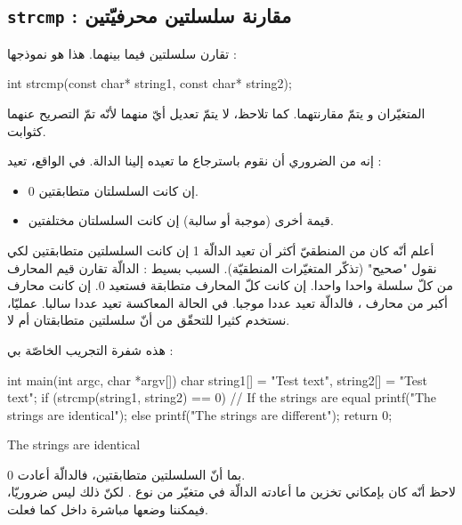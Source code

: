 \subsection{\texttt{strcmp} : مقارنة سلسلتين محرفيّتين}

تقارن سلسلتين فيما بينهما. هذا هو نموذجها :

\begin{Csource}
int strcmp(const char* string1, const char* string2);
\end{Csource}

المتغيّران
و
يتمّ مقارنتهما. كما تلاحظ، لا يتمّ تعديل أيّ منهما لأنّه تمّ التصريح عنهما كثوابت.

إنه من الضروري أن نقوم باسترجاع ما تعيده إلينا الدالة. في الواقع،  تعيد :

\begin{itemize}
  \item 0 إن كانت السلسلتان متطابقتين.
  \item قيمة أخرى (موجبة أو سالبة) إن كانت السلسلتان مختلفتين.
\end{itemize}

\begin{information}
أعلم أنّه كان من المنطقيّ أكثر أن تعيد الدالّة 1 إن كانت السلسلتين متطابقتين لكي نقول "صحيح" (تذكّر المتغيّرات المنطقيّة). السبب بسيط :
الدالّة تقارن قيم المحارف من كلّ سلسلة واحدا واحدا. إن كانت كلّ المحارف متطابقة فستعيد 0. إن كانت محارف
أكبر من محارف
،
فالدالّة تعيد عددا موجبا. في الحالة المعاكسة تعيد عددا سالبا. عمليّا، نستخدم
كثيرا للتحقّق من أنّ سلسلتين متطابقتان أم لا.
\end{information}

هذه شفرة التجريب الخاصّة بي :

\begin{Csource}
int main(int argc, char *argv[])
{
	char string1[] = "Test text", string2[] = "Test text";
	if (strcmp(string1, string2) == 0) // If the strings are equal
	{
    		printf("The strings are identical\n");
 	}
	 else
	{
    		printf("The strings are different\n");
	 }
	return 0;
}
\end{Csource}

\begin{Console}
The strings are identical
\end{Console}

بما أنّ السلسلتين متطابقتين، فالدالّة
أعادت 0.\\
لاحظ أنّه كان بإمكاني تخزين ما أعادته الدالّة في متغيّر من نوع
.
لكنّ ذلك ليس ضروريّا، فيمكننا وضعها مباشرة داخل
كما فعلت.

